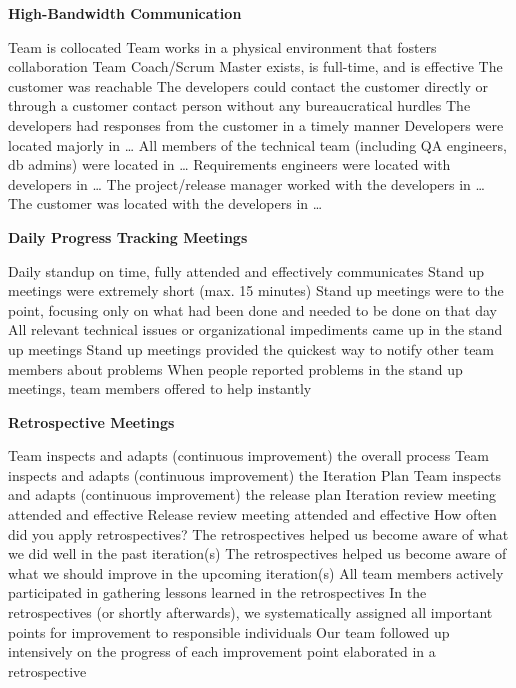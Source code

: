 \textbf{High-Bandwidth Communication}
\begin{itemize}
	\taa Team is collocated
	\taa Team works in a physical environment that fosters collaboration
	\taa Team Coach/Scrum Master exists, is full-time, and is effective 
	\pam The customer was reachable
	\pam The developers could contact the customer directly or through a customer contact person without any bureaucratical hurdles 
	\pam The developers had responses from the customer in a timely manner 
	\pam Developers were located majorly in \ldots
	\pam All members of the technical team (including QA engineers, db admins) were located in \ldots
	\pam Requirements engineers were located with developers in \ldots
	\pam The project/release manager worked with the developers in \ldots
	\pam The customer was located with the developers in \ldots
\end{itemize}

\textbf{Daily Progress Tracking Meetings}
\begin{itemize}
	\taa Daily standup on time, fully attended and effectively communicates
	\pam Stand up meetings were extremely short (max. 15 minutes) 
	\pam Stand up meetings were to the point, focusing only on what had been done and needed to be done on that day 
	\pamr All relevant technical issues or organizational impediments came up in the stand up meetings 
	\pamr Stand up meetings provided the quickest way to notify other team members about problems 
	\pamr When people reported problems in the stand up meetings, team members offered to help instantly 
\end{itemize}

\textbf{Retrospective Meetings}
\begin{itemize}
	\taa Team inspects and adapts (continuous improvement) the overall process
	\taa Team inspects and adapts (continuous improvement) the Iteration Plan 
	\taa Team inspects and adapts (continuous improvement) the release plan
	\taa Iteration review meeting attended and effective
	\taa Release review meeting attended and effective
	\pam How often did you apply retrospectives?
	\pam The retrospectives helped us become aware of what we did well in the past iteration(s)
	\pam The retrospectives helped us become aware of what we should improve in the upcoming iteration(s) 
	\pam All team members actively participated in gathering lessons learned in the retrospectives
	\pamr In the retrospectives (or shortly afterwards), we systematically assigned all important points for improvement to responsible individuals 
	\pamr Our team followed up intensively on the progress of each improvement point elaborated in a retrospective
\end{itemize}

